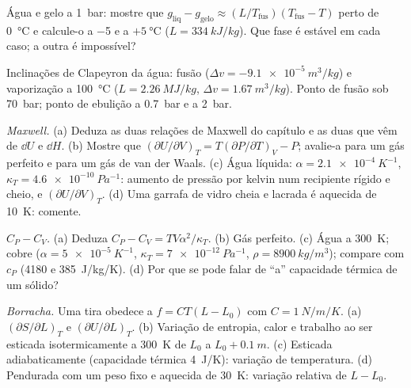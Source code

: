 \begin{exercise}[$\star$]\label{exo:b2:thermodynamic-potentials:3}
Água e gelo a \qty{1}{bar}: mostre que $g_{\text{liq}} - g_{\text{gelo}} \approx
(L/T_{\text{fus}})(T_{\text{fus}} - T)$ perto de \qty{0}{\celsius} e calcule-o
a \qty{-5}{} e a $+\qty{5}{\celsius}$ ($L = \qty{334}{kJ/kg}$). Que fase é
estável em cada caso; a outra é impossível?
\end{exercise}

\begin{exercise}[$\star$]\label{exo:b2:thermodynamic-potentials:4}
Inclinações de Clapeyron da água: fusão ($\Delta v = -\qty{9.1e-5}{m^3/kg}$) e
vaporização a \qty{100}{\celsius} ($L = \qty{2.26}{MJ/kg}$, $\Delta v =
\qty{1.67}{m^3/kg}$). Ponto de fusão sob \qty{70}{bar}; ponto de ebulição a
\qty{0.7}{bar} e a \qty{2}{bar}.
\end{exercise}

\begin{exercise}[$\star\star$]\label{exo:b2:thermodynamic-potentials:5}
\emph{Maxwell.} (a) Deduza as duas relações de Maxwell do capítulo
e as duas que vêm de $\dd U$ e $\dd H$. (b) Mostre que $(\partial U/\partial V)_T =
T(\partial P/\partial T)_V - P$; avalie-a para um gás perfeito e para um gás de van
der Waals. (c) Água líquida: $\alpha = \qty{2.1e-4}{K^{-1}}$, $\kappa_T =
\qty{4.6e-10}{Pa^{-1}}$: aumento de pressão por kelvin num recipiente rígido e cheio,
e $(\partial U/\partial V)_T$. (d) Uma garrafa de vidro cheia e lacrada é aquecida
de \qty{10}{K}: comente.
\end{exercise}

\begin{exercise}[$\star\star$]\label{exo:b2:thermodynamic-potentials:6}
\emph{$C_P - C_V$.} (a) Deduza $C_P - C_V = TV\alpha^2/\kappa_T$. (b)
Gás perfeito. (c) Água a \qty{300}{K}; cobre ($\alpha = \qty{5e-5}{K^{-1}}$,
$\kappa_T = \qty{7e-12}{Pa^{-1}}$, $\rho = \qty{8900}{kg/m^3}$); compare com
$c_P$ (\qty{4180}{} e \qty{385}{J/kg/K}). (d) Por que se pode falar de
``a'' capacidade térmica de um sólido?
\end{exercise}

\begin{exercise}[$\star\star$]\label{exo:b2:thermodynamic-potentials:7}
\emph{Borracha.} Uma tira obedece a $f = CT(L - L_0)$ com $C = \qty{1}{N/m/K}$.
(a) $(\partial S/\partial L)_T$ e $(\partial U/\partial L)_T$. (b) Variação de
entropia, calor e trabalho ao ser esticada isotermicamente a \qty{300}{K} de
$L_0$ a $L_0 + \qty{0.1}{m}$. (c) Esticada adiabaticamente (capacidade
térmica \qty{4}{J/K}): variação de temperatura. (d) Pendurada com um peso fixo
e aquecida de \qty{30}{K}: variação relativa de $L - L_0$.
\end{exercise}

